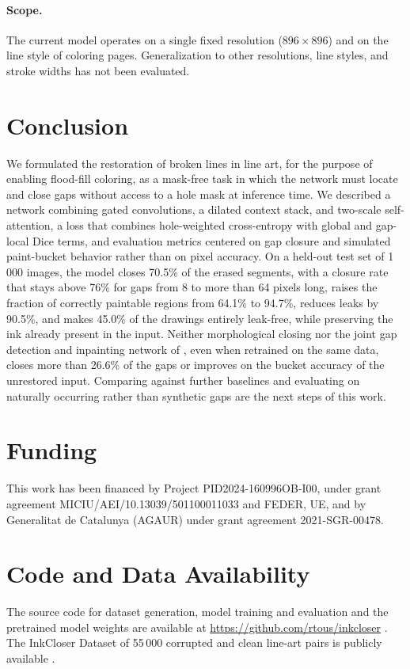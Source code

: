 \documentclass[11pt]{article}
\begin{document}
\paragraph{Scope.} The current model operates on a single fixed resolution
($896\times 896$) and on the line style of coloring pages. Generalization to other
resolutions, line styles, and stroke widths has not been evaluated.

\section{Conclusion}

We formulated the restoration of broken lines in line art, for the purpose
of enabling flood-fill coloring, as a mask-free task in which the network must
locate and close gaps without access to a hole mask at inference time. We
described a network combining gated convolutions, a dilated context stack, and
two-scale self-attention, a loss that combines hole-weighted cross-entropy with
global and gap-local Dice terms, and evaluation metrics centered on gap closure and
simulated paint-bucket behavior rather than on pixel accuracy. On a held-out test set
of 1\,000 images, the model closes 70.5\% of the erased segments, with a closure rate
that stays above 76\% for gaps from 8 to more than 64 pixels long, raises the
fraction of correctly paintable regions from 64.1\% to 94.7\%, reduces leaks by
90.5\%, and makes 45.0\% of the drawings entirely leak-free, while preserving the ink
already present in the input. Neither morphological closing nor the joint gap
detection and inpainting network of \citet{sasaki2017joint}, even when retrained on
the same data, closes more than 26.6\% of the gaps or improves on the bucket accuracy
of the unrestored input. Comparing against further baselines and evaluating on naturally occurring rather than synthetic gaps
are the next steps of this work.

\section*{Funding}
This work has been financed by Project PID2024-160996OB-I00, under grant agreement
MICIU/AEI/10.13039/501100011033 and FEDER, UE, and by Generalitat de Catalunya (AGAUR)
under grant agreement 2021-SGR-00478.

\section*{Code and Data Availability}
The source code for dataset generation, model training and evaluation and the pretrained model weights are
available at \url{https://github.com/rtous/inkcloser} \citep{codeInkCloser}.
The InkCloser Dataset of 55\,000 corrupted and clean line-art pairs is publicly available \citep{datasetInkCloser}.


 
\end{document}
